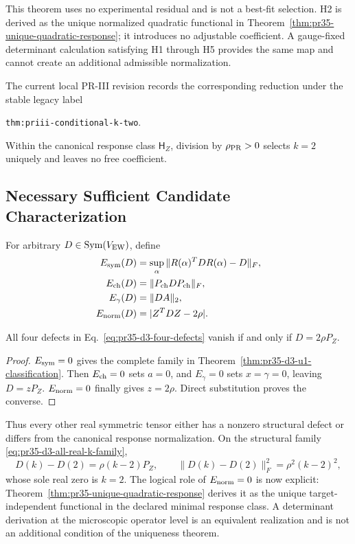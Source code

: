 This theorem uses no experimental residual and is not a best-fit selection. H2 is derived as the unique normalized quadratic functional in Theorem~\ref{thm:pr35-unique-quadratic-response}; it introduces no adjustable coefficient.  A gauge-fixed determinant calculation satisfying H1 through H5 provides the same map and cannot create an additional admissible normalization.

The current local PR-III revision records the corresponding reduction under the stable legacy label
\begin{center}
\texttt{thm:priii-conditional-k-two}.
\end{center}
Within the canonical response class $\mathsf H_Z$, division by $\rho_{\rm PR}>0$ selects $k=2$ uniquely and leaves no free coefficient.

\subsection{Necessary Sufficient Candidate Characterization}

For arbitrary $D\in\operatorname{Sym}(V_{\rm EW})$, define
\begin{align}
 E_{\rm sym}(D)&=\sup_{\alpha}
 \|R(\alpha)^TDR(\alpha)-D\|_F,\nonumber\\
 E_{\rm ch}(D)&=\|P_{\rm ch}DP_{\rm ch}\|_F,\nonumber\\
 E_{\gamma}(D)&=\|DA\|_2,\nonumber\\
 E_{\rm norm}(D)&=|Z^TDZ-2\rho|.
 \label{eq:pr35-d3-four-defects}
\end{align}

\begin{theorem}
\label{thm:pr35-d3-four-defect-certificate}
All four defects in Eq.~\eqref{eq:pr35-d3-four-defects} vanish if and only if $D=2\rho P_Z$.
\end{theorem}

\begin{proof}
$E_{\rm sym}=0$ gives the complete family in Theorem~\ref{thm:pr35-d3-u1-classification}.  Then $E_{\rm ch}=0$ sets $a=0$, and $E_\gamma=0$ sets $x=\gamma=0$, leaving $D=zP_Z$. $E_{\rm norm}=0$ finally gives $z=2\rho$.  Direct substitution proves the converse.
\end{proof}

Thus every other real symmetric tensor either has a nonzero structural defect or differs from the canonical response normalization. On the structural family \eqref{eq:pr35-d3-all-real-k-family},
\begin{equation}
 D(k)-D(2)=\rho(k-2)P_Z,\qquad
 \|D(k)-D(2)\|_F^2=\rho^2(k-2)^2,
 \label{eq:pr35-d3-complete-real-defect}
\end{equation}
whose sole real zero is $k=2$.  The logical role of $E_{\rm norm}=0$ is now explicit: Theorem~\ref{thm:pr35-unique-quadratic-response} derives it as the unique target-independent functional in the declared minimal response class. A determinant derivation at the microscopic operator level is an equivalent realization and is not an additional condition of the uniqueness theorem.

